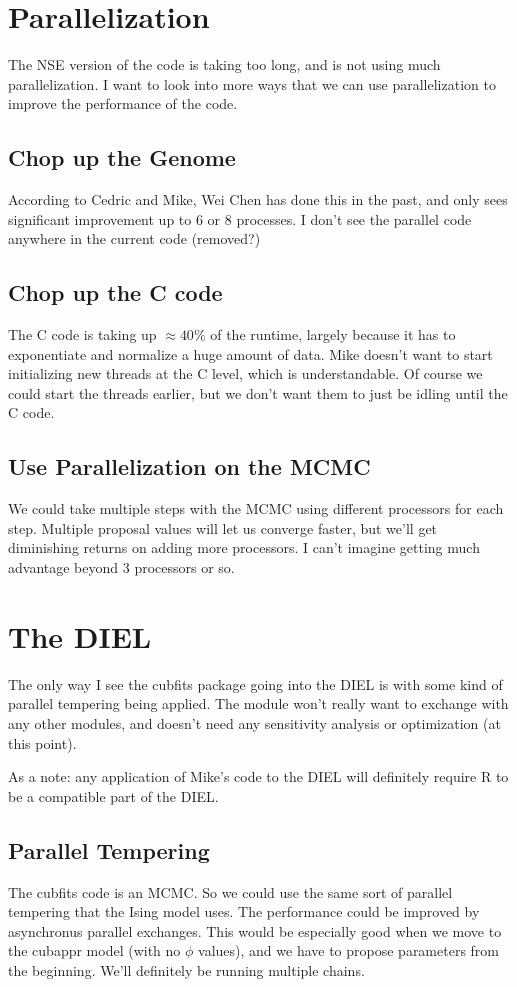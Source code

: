 \documentclass[11pt]{article} %
\begin{document}
\section{Parallelization}

The NSE version of the code is taking too long, and is not using much parallelization. I want to look into more ways that we can use parallelization to improve the performance of the code. 

\subsection{Chop up the Genome}
According to Cedric and Mike, Wei Chen has done this in the past, and only sees significant improvement up to 6 or 8 processes. I don't see the parallel code anywhere in the current code (removed?) 

\subsection{Chop up the C code}
The C code is taking up $\approx40\%$ of the runtime, largely because it has to exponentiate and normalize a huge amount of data. Mike doesn't want to start initializing new threads at the C level, which is understandable. Of course we could start the threads earlier, but we don't want them to just be idling until the C code.

\subsection{Use Parallelization on the MCMC}
We could take multiple steps with the MCMC using different processors for each step. Multiple proposal values will let us converge faster, but we'll get diminishing returns on adding more processors. I can't imagine getting much advantage beyond 3 processors or so.

\section{The DIEL}

The only way I see the cubfits package going into the DIEL is with some kind of parallel tempering being applied. The module won't really want to exchange with any other modules, and doesn't need any sensitivity analysis or optimization (at this point).

As a note: any application of Mike's code to the DIEL will definitely require R to be a compatible part of the DIEL.

\subsection{Parallel Tempering}
The cubfits code is an MCMC. So we could use the same sort of parallel tempering that the Ising model uses. The performance could be improved by asynchronus parallel exchanges. This would be especially good when we move to the cubappr model (with no $\phi$ values), and we have to propose parameters from the beginning. We'll definitely be running multiple chains.
\end{document}
